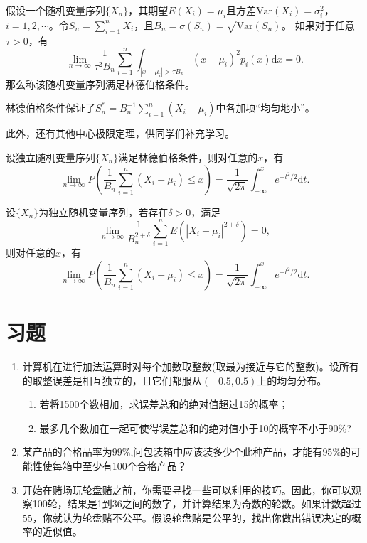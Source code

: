 \begin{definition}[林德伯格条件]
假设一个随机变量序列$\{X_n\}$，其期望$E(X_i) = \mu_i$且方差$\text{Var}(X_i)=\sigma_i^2$，$i=1,2,\cdots$。令$S_n = \sum_{i=1}^n X_i$，且$B_n = \sigma(S_n) = \sqrt{\text{Var}(S_n)}$。
如果对于任意$\tau >0$，有
$$
\lim_{n\rightarrow \infty} \frac{1}{\tau^2 B_n} \sum_{i=1}^n \int_{|x-\mu_i| > \tau B_n} (x-\mu_i)^2 p_i(x)\text{d} x = 0.
$$
那么称该随机变量序列满足林德伯格条件。
\end{definition}
\begin{remark}
    林德伯格条件保证了$S_n^{\ast} = B_n^{-1}\sum_{i=1}^n (X_i-\mu_i)$中各加项“均匀地小”。
\end{remark}
此外，还有其他中心极限定理，供同学们补充学习。
\begin{theorem}[林德伯格中心极限定理]
设独立随机变量序列$\{X_n\}$满足林德伯格条件，则对任意的$x$，有
$$
\lim_{n\rightarrow \infty} P\left(\frac{1}{B_n} \sum_{i=1}^n (X_i-\mu_i) \leq x\right)
= \frac{1}{\sqrt{2\pi}}\int_{-\infty}^{x} e^{-t^2/2}\text{d}t.
$$
\end{theorem}

\begin{theorem}[李雅普诺夫中心极限定理]
设$\{X_n\}$为独立随机变量序列，若存在$\delta >0$，满足
$$
\lim_{n\rightarrow \infty} \frac{1}{B_{n}^{2+\delta}}\sum_{i=1}^n E\left( |X_i - \mu_i|^{2+\delta} \right) =0,
$$
则对任意的$x$，有
$$
\lim_{n\rightarrow \infty} P\left(\frac{1}{B_n} \sum_{i=1}^n (X_i-\mu_i) \leq x\right)
= \frac{1}{\sqrt{2\pi}}\int_{-\infty}^{x} e^{-t^2/2}\text{d}t.
$$
\end{theorem}

\section{习题}
\begin{enumerate}
    \item 计算机在进行加法运算时对每个加数取整数(取最为接近与它的整数)。设所有的取整误差是相互独立的，且它们都服从$(-0.5,0.5)$上的均匀分布。
    \begin{enumerate}
        \item 若将1500个数相加，求误差总和的绝对值超过15的概率；
\item 最多几个数加在一起可使得误差总和的绝对值小于10的概率不小于90\%?
    \end{enumerate}
\item  某产品的合格品率为$99\%$,问包装箱中应该装多少个此种产品，才能有$95\%$的可能性使每箱中至少有100个合格产品？

\item 开始在赌场玩轮盘赌之前，你需要寻找一些可以利用的技巧。因此，你可以观察100轮，结果是1到36之间的数字，并计算结果为奇数的轮数。如果计数超过55，你就认为轮盘赌不公平。假设轮盘赌是公平的，找出你做出错误决定的概率的近似值。

\end{enumerate}